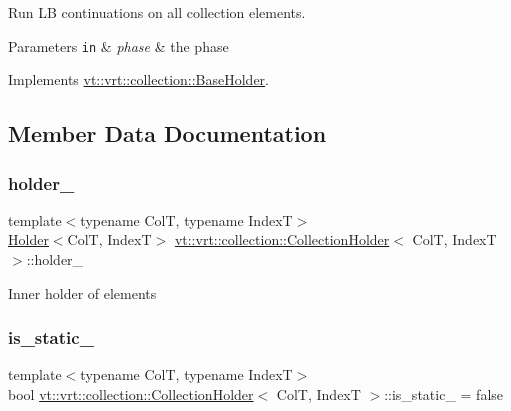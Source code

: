 Run LB continuations on all collection elements. 


\begin{DoxyParams}[1]{Parameters}
\mbox{\tt in}  & {\em phase} & the phase \\
\hline
\end{DoxyParams}


Implements \hyperlink{structvt_1_1vrt_1_1collection_1_1_base_holder_ab9f7a730ced86b24d75b3f33ea3db3e8}{vt\+::vrt\+::collection\+::\+Base\+Holder}.



\subsection{Member Data Documentation}
\mbox{\label{structvt_1_1vrt_1_1collection_1_1_collection_holder_a509a3abe1ab350cc1d108030977ab0e9}} 
\subsubsection{\texorpdfstring{holder\+\_\+}{holder\_}}
{\footnotesize\ttfamily template$<$typename ColT, typename IndexT$>$ \\
\hyperlink{structvt_1_1vrt_1_1collection_1_1_holder}{Holder}$<$ColT, IndexT$>$ \hyperlink{structvt_1_1vrt_1_1collection_1_1_collection_holder}{vt\+::vrt\+::collection\+::\+Collection\+Holder}$<$ ColT, IndexT $>$\+::holder\+\_\+}

Inner holder of elements \mbox{\label{structvt_1_1vrt_1_1collection_1_1_collection_holder_ab8d1f8570cd85775b2c8317255827dae}} 
\subsubsection{\texorpdfstring{is\+\_\+static\+\_\+}{is\_static\_}}
{\footnotesize\ttfamily template$<$typename ColT, typename IndexT$>$ \\
bool \hyperlink{structvt_1_1vrt_1_1collection_1_1_collection_holder}{vt\+::vrt\+::collection\+::\+Collection\+Holder}$<$ ColT, IndexT $>$\+::is\+\_\+static\+\_\+ = false}

